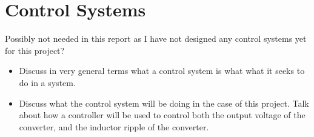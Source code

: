 \section{Control Systems}

Possibly not needed in this report as I have not designed any control systems yet for this project?

\begin{itemize}
    
    \item
    Discuss in very general terms what a control system is what what it seeks to do in a system.

    \item 
    Discuss what the control system will be doing in the case of this project. Talk about how a controller will be used to control both the output voltage of the converter, and the inductor ripple of the converter.  

    \end{itemize}